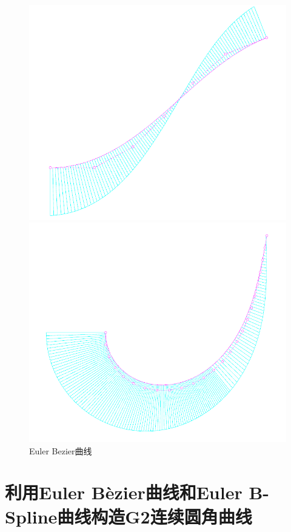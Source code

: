 \documentclass[utf8]{ctexart} %
\begin{document}
		\begin{figure}[htbp]
			\centering
			\begin{minipage}{0.49\linewidth}
				\centering
				\includegraphics[width=0.9\linewidth]{figures/EulerBezierDef1.png}
			\end{minipage}
			\begin{minipage}{0.49\linewidth}
				\centering
				\includegraphics[width=0.9\linewidth]{figures/EulerBezierDef2.png}
			\end{minipage}
			\caption{Euler Bezier曲线}
		\end{figure}
		
		
		\section{利用Euler B\`{e}zier曲线和Euler B-Spline曲线构造G2连续圆角曲线}
\end{document}
